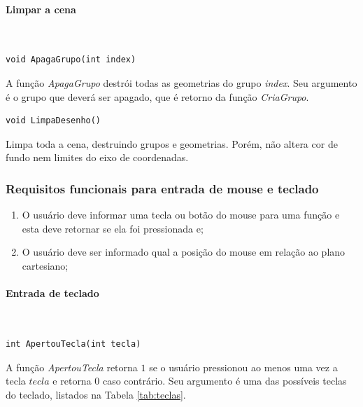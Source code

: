 \paragraph{Limpar a cena}\mbox{}\\

\begin{lstlisting}
void ApagaGrupo(int index)
\end{lstlisting}
A função \emph{ApagaGrupo} destrói todas as geometrias do grupo \emph{index}. Seu argumento é o grupo que deverá ser apagado, que é retorno da função \emph{CriaGrupo}.

\begin{lstlisting}
void LimpaDesenho()
\end{lstlisting}
Limpa toda a cena, destruindo grupos e geometrias. Porém, não altera cor de fundo nem limites do eixo de coordenadas.

 \subsubsection{Requisitos funcionais para entrada de mouse e teclado}
 \begin{enumerate}
 \item O usuário deve informar uma tecla ou botão do mouse para uma função e esta deve retornar se ela foi pressionada e;
 \item O usuário deve ser informado qual a posição do mouse em relação ao plano cartesiano;
 \end{enumerate}

 \paragraph{Entrada de teclado}\mbox{}\\
\begin{lstlisting}
int ApertouTecla(int tecla)
\end{lstlisting}
A função \emph{ApertouTecla} retorna $1$ se o usuário pressionou ao menos uma vez a tecla $tecla$ e retorna $0$ caso contrário. Seu argumento é uma das possíveis teclas do teclado, listados na Tabela \ref{tab:teclas}.


